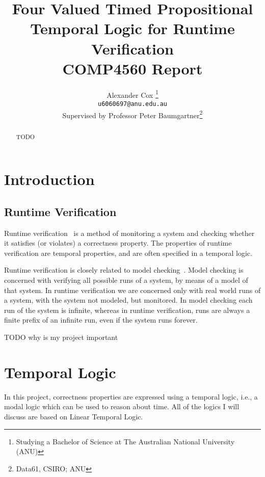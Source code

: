 \documentclass[a4paper]{article}
\title{
  Four Valued Timed Propositional Temporal Logic for Runtime Verification\\
  \normalsize{} COMP4560 Report
}
\author{
  Alexander Cox
  \thanks{Studying a Bachelor of Science at The Australian National University (ANU)}\\
  \small\texttt{u6060697@anu.edu.au}\\
  \normalsize{}Supervised by Professor Peter Baumgartner\thanks{Data61, CSIRO\@; ANU}
}
\begin{document}
\lstset{language=Scala,basicstyle=\ttfamily\small,showstringspaces=false,frame=tl,framerule=1pt,float=tbh,captionpos=b}
\maketitle

\begin{abstract} %
  TODO
\end{abstract}
\newpage
\tableofcontents

\section{Introduction}
\subsection{Runtime Verification}
Runtime verification~\autocite{colin2005rv} is a method of monitoring a system and checking whether it satisfies (or violates) a correctness property.
The properties of runtime verification are temporal properties, and are often specified in a temporal logic. %

Runtime verification is closely related to model checking~\autocite{baier2008principles}. Model checking is concerned with verifying all possible runs of a system, by means of a model of that system. In runtime verification we are concerned only with real world runs of a system, with the system not modeled, but monitored. In model checking each run of the system is infinite, whereas in runtime verification, runs are always a finite prefix of an infinite run, even if the system runs forever.

TODO why is my project important

\section{Temporal Logic}
In this project, correctness properties are expressed using a temporal logic, i.e., a modal logic which can be used to reason about time. All of the logics I will discuss are based on Linear Temporal Logic.
\end{document}
